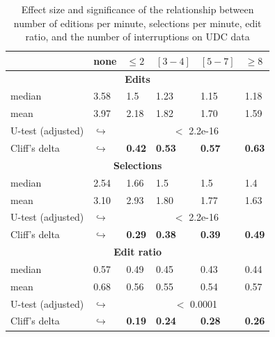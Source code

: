 \begin{table}[ht!]
	\tiny
	\renewcommand{\arraystretch}{1.3}
	\caption{Effect size and significance of the relationship between number of editions per minute, selections per minute, edit ratio, and the number of interruptions on UDC data} 
	\label{tbl:p_value_udc}
	\centering
	\begin{tabular}{l | p{0.75cm} | p{1.2cm} | p{1.2cm} | p{1.2cm} |p{1.2cm}} 
		\hline
		& none & $\leq 2$ & $[3 - 4]$ & $[5 - 7]$ & $\geq 8$  \\  
		\hline
		\hline
		\multicolumn{6}{c}{\textbf{Edits}} \\
		\hline
		median & 3.58 & 1.5 & 1.23 & 1.15 & 1.18 \\
		\cline{2-6} 
		mean & 3.97 &	2.18 & 1.82 & 1.70 & 1.59 \\ 
		\cline{3-6} 
		U-test (adjusted) & $\hookrightarrow$ & \multicolumn{4}{c}{$<$ 2.2e-16} \\
		\cline{3-6} 
		Cliff's delta & $\hookrightarrow$	& \textbf{0.42} & \textbf{0.53} & \textbf{0.57} & \textbf{0.63}    \\
		
		
		\hline
		\multicolumn{6}{c}{\textbf{Selections}} \\
		\hline 
		median & 2.54 & 1.66 & 1.5 & 1.5 & 1.4 \\
		\cline{2-6} 
		mean & 3.10 &	2.93 & 1.80 & 1.77 & 1.63  \\ 
		\cline{3-6} 
		U-test (adjusted)& $\hookrightarrow$ & \multicolumn{4}{c}{$<$ 2.2e-16} \\
		\cline{3-6} 
		Cliff's delta & $\hookrightarrow$	& \textbf{0.29} & \textbf{0.38} & \textbf{0.39} & \textbf{0.49} \\  
		\hline
		
		\multicolumn{6}{c}{\textbf{Edit ratio}} \\
		\hline 
		median & 0.57 & 0.49 & 0.45 & 0.43 & 0.44 \\
		\cline{2-6} 
		mean & 0.68 & 0.56 & 0.55 & 0.54 & 0.57 \\ 
		\cline{3-6} 
		\cline{3-6} 
		U-test (adjusted) &  $\hookrightarrow$& \multicolumn{4}{c}{$<$ 0.0001} \\
		\cline{3-6} 
		Cliff's delta & $\hookrightarrow$ & \textbf{0.19} & \textbf{0.24} & \textbf{0.28} & \textbf{0.26} \\ 
		\hline
		
	\end{tabular}
\end{table}

